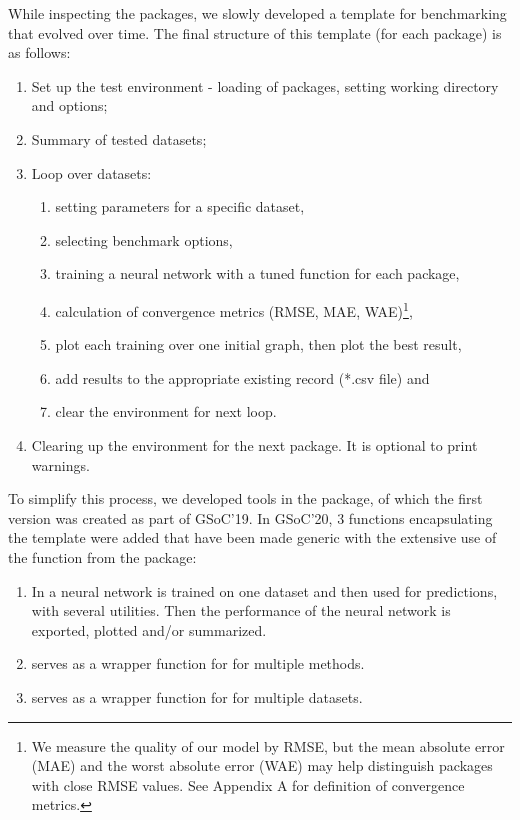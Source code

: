 While inspecting the packages, we slowly developed a template for
benchmarking that evolved over time. The final structure of this
template (for each package) is as follows:

\begin{enumerate}
\def\labelenumi{\arabic{enumi}.}
\tightlist
\item
  Set up the test environment - loading of packages, setting working
  directory and options;
\item
  Summary of tested datasets;
\item
  Loop over datasets:

  \begin{enumerate}
  \def\labelenumii{\alph{enumii}.}
  \tightlist
  \item
    setting parameters for a specific dataset,
  \item
    selecting benchmark options,
  \item
    training a neural network with a tuned function for each package,
  \item
    calculation of convergence metrics (RMSE, MAE, WAE)\footnote{We
      measure the quality of our model by RMSE, but the mean absolute
      error (MAE) and the worst absolute error (WAE) may help
      distinguish packages with close RMSE values. See Appendix A for
      definition of convergence metrics.},
  \item
    plot each training over one initial graph, then plot the best
    result,
  \item
    add results to the appropriate existing record (*.csv file) and
  \item
    clear the environment for next loop.
  \end{enumerate}
\item
  Clearing up the environment for the next package. It is optional to
  print warnings.
\end{enumerate}

To simplify this process, we developed tools in the 
package, of which the first version was created as part of GSoC'19. In
GSoC'20, 3 functions encapsulating the template were added that have
been made generic with the extensive use of the  function
from the  package:

\begin{enumerate}
\def\labelenumi{\arabic{enumi}.}
\tightlist
\item
  In  a neural network is trained on one
  dataset and then used for predictions, with several utilities. Then
  the performance of the neural network is exported, plotted and/or
  summarized.
\item
   serves as a wrapper function for
   for multiple methods.
\item
   serves as a wrapper function for
   for multiple datasets.
\end{enumerate}

